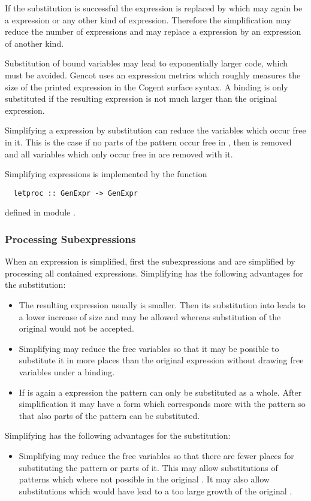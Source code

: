 If the substitution is successful the  expression is replaced by  which may again be a 
expression or any other kind of expression. Therefore the simplification may reduce the number of  expressions
and may replace a  expression by an expression of another kind.

Substitution of bound variables may lead to exponentially larger code, which must be avoided. Gencot uses an expression metrics
which roughly measures the size of the printed expression in the Cogent surface syntax. A binding is only substituted if the 
resulting expression is not much larger than the original  expression.

Simplifying a  expression by substitution can reduce the variables which occur free in it. This is the case if no
parts of the pattern  occur free in , then  is removed and all variables which only occur free
in  are removed with it.

Simplifying  expressions is implemented by the function
\begin{verbatim}
  letproc :: GenExpr -> GenExpr
\end{verbatim}
defined in module .

\subsubsection{Processing Subexpressions}

When an expression  is simplified, first the subexpressions  and  are
simplified by processing all contained  expressions. Simplifying  has the following advantages for the 
substitution:
\begin{itemize}
\item The resulting expression usually is smaller. Then its substitution into  leads to a lower increase of
size and may be allowed whereas substitution of the original  would not be accepted.
\item Simplifying may reduce the free variables so that it may be possible to substitute it in more places than
the original expression without drawing free variables under a binding.
\item If  is again a  expression the pattern can only be substituted as a whole. After simplification 
it may have a form which corresponds more with the pattern so that also parts of the pattern can be substituted.
\end{itemize}
Simplifying  has the following advantages for the substitution:
\begin{itemize}
\item Simplifying may reduce the free variables so that there are fewer places for substituting the pattern
or parts of it. This may allow substitutions of patterns which where not possible in the original .
It may also allow substitutions which would have lead to a too large growth of the original .
\end{itemize}

